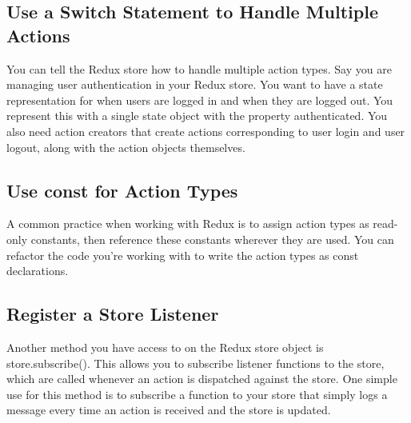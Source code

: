 \documentclass{article}%
\begin{document}
%
\subsection{Use a Switch Statement to Handle Multiple Actions}%
\label{subsec:UseaSwitchStatementtoHandleMultipleActions}%
You can tell the Redux store how to handle multiple action types. Say you are managing user authentication in your Redux store. You want to have a state representation for when users are logged in and when they are logged out. You represent this with a single state object with the property authenticated. You also need action creators that create actions corresponding to user login and user logout, along with the action objects themselves.\newline%

%
\subsection{Use const for Action Types}%
\label{subsec:UseconstforActionTypes}%
A common practice when working with Redux is to assign action types as read{-}only constants, then reference these constants wherever they are used. You can refactor the code you're working with to write the action types as const declarations.\newline%

%
\subsection{Register a Store Listener}%
\label{subsec:RegisteraStoreListener}%
Another method you have access to on the Redux store object is store.subscribe(). This allows you to subscribe listener functions to the store, which are called whenever an action is dispatched against the store. One simple use for this method is to subscribe a function to your store that simply logs a message every time an action is received and the store is updated.\newline%

%
\end{document}
